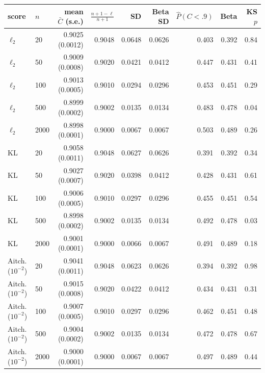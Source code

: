 \begin{tabular}{llrrrrrrr}
\toprule
score & $n$ & mean $\bar C$ (s.e.) & $\frac{n+1-\ell}{n+1}$ & SD & Beta SD & $\hat P(C<.9)$ & Beta & KS $p$ \\
\midrule
$\ell_2$ & 20 & 0.9025 (0.0012) & 0.9048 & 0.0648 & 0.0626 & 0.403 & 0.392 & 0.84 \\
$\ell_2$ & 50 & 0.9009 (0.0008) & 0.9020 & 0.0421 & 0.0412 & 0.447 & 0.431 & 0.41 \\
$\ell_2$ & 100 & 0.9013 (0.0005) & 0.9010 & 0.0294 & 0.0296 & 0.453 & 0.451 & 0.29 \\
$\ell_2$ & 500 & 0.8999 (0.0002) & 0.9002 & 0.0135 & 0.0134 & 0.483 & 0.478 & 0.04 \\
$\ell_2$ & 2000 & 0.8998 (0.0001) & 0.9000 & 0.0067 & 0.0067 & 0.503 & 0.489 & 0.26 \\
KL & 20 & 0.9058 (0.0011) & 0.9048 & 0.0627 & 0.0626 & 0.391 & 0.392 & 0.34 \\
KL & 50 & 0.9027 (0.0007) & 0.9020 & 0.0398 & 0.0412 & 0.428 & 0.431 & 0.61 \\
KL & 100 & 0.9006 (0.0005) & 0.9010 & 0.0297 & 0.0296 & 0.455 & 0.451 & 0.54 \\
KL & 500 & 0.8998 (0.0002) & 0.9002 & 0.0135 & 0.0134 & 0.492 & 0.478 & 0.03 \\
KL & 2000 & 0.9001 (0.0001) & 0.9000 & 0.0066 & 0.0067 & 0.491 & 0.489 & 0.18 \\
Aitch.($10^{-2}$) & 20 & 0.9041 (0.0011) & 0.9048 & 0.0623 & 0.0626 & 0.394 & 0.392 & 0.98 \\
Aitch.($10^{-2}$) & 50 & 0.9015 (0.0008) & 0.9020 & 0.0422 & 0.0412 & 0.434 & 0.431 & 0.31 \\
Aitch.($10^{-2}$) & 100 & 0.9007 (0.0005) & 0.9010 & 0.0297 & 0.0296 & 0.462 & 0.451 & 0.48 \\
Aitch.($10^{-2}$) & 500 & 0.9004 (0.0002) & 0.9002 & 0.0135 & 0.0134 & 0.472 & 0.478 & 0.67 \\
Aitch.($10^{-2}$) & 2000 & 0.9000 (0.0001) & 0.9000 & 0.0067 & 0.0067 & 0.497 & 0.489 & 0.44 \\
\bottomrule
\end{tabular}
